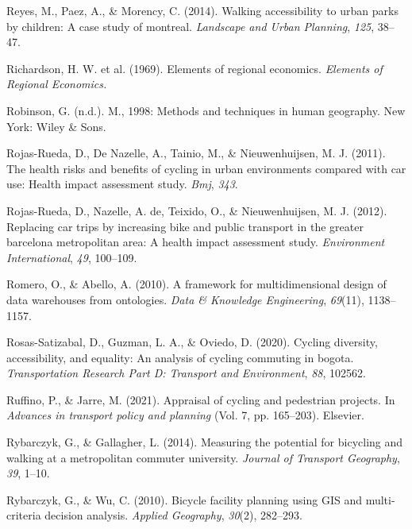\documentclass[
11pt, %
oneside, %
english, %
singlespacing, %
]{macthesis} %
\newlength{\cslhangindent}
\newenvironment{CSLReferences}[2] %
{\begin{list}{}{%
	\setlength{\itemindent}{0pt}
	\setlength{\leftmargin}{0pt}
	\setlength{\parsep}{0pt}
	\ifodd #1
	\setlength{\leftmargin}{\cslhangindent}
	\setlength{\itemindent}{-1\cslhangindent}
	\fi
	\setlength{\itemsep}{#2\baselineskip}}}
{\end{list}}
\begin{document}
\begin{CSLReferences}{1}{0}
Reyes, M., Paez, A., \& Morency, C. (2014). Walking accessibility to urban parks by children: A case study of montreal. \emph{Landscape and Urban Planning}, \emph{125}, 38--47.

Richardson, H. W. et al. (1969). Elements of regional economics. \emph{Elements of Regional Economics.}

Robinson, G. (n.d.). M., 1998: Methods and techniques in human geography. New York: Wiley \& Sons.

Rojas-Rueda, D., De Nazelle, A., Tainio, M., \& Nieuwenhuijsen, M. J. (2011). The health risks and benefits of cycling in urban environments compared with car use: Health impact assessment study. \emph{Bmj}, \emph{343}.

Rojas-Rueda, D., Nazelle, A. de, Teixido, O., \& Nieuwenhuijsen, M. J. (2012). Replacing car trips by increasing bike and public transport in the greater barcelona metropolitan area: A health impact assessment study. \emph{Environment International}, \emph{49}, 100--109.

Romero, O., \& Abello, A. (2010). A framework for multidimensional design of data warehouses from ontologies. \emph{Data \& Knowledge Engineering}, \emph{69}(11), 1138--1157.

Rosas-Satizabal, D., Guzman, L. A., \& Oviedo, D. (2020). Cycling diversity, accessibility, and equality: An analysis of cycling commuting in bogota. \emph{Transportation Research Part D: Transport and Environment}, \emph{88}, 102562.

Ruffino, P., \& Jarre, M. (2021). Appraisal of cycling and pedestrian projects. In \emph{Advances in transport policy and planning} (Vol. 7, pp. 165--203). Elsevier.

Rybarczyk, G., \& Gallagher, L. (2014). Measuring the potential for bicycling and walking at a metropolitan commuter university. \emph{Journal of Transport Geography}, \emph{39}, 1--10.

Rybarczyk, G., \& Wu, C. (2010). Bicycle facility planning using GIS and multi-criteria decision analysis. \emph{Applied Geography}, \emph{30}(2), 282--293.


\end{CSLReferences}
\end{document}
